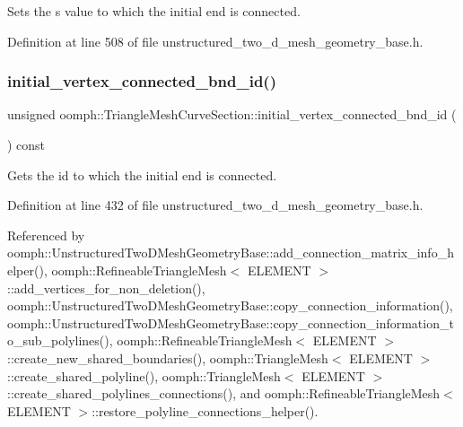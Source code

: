 Sets the s value to which the initial end is connected. 



Definition at line 508 of file unstructured\+\_\+two\+\_\+d\+\_\+mesh\+\_\+geometry\+\_\+base.\+h.

\mbox{\label{classoomph_1_1TriangleMeshCurveSection_aa20f1e54ff6f0f1ef0c550e0a2d119bb}} 
\subsubsection{\texorpdfstring{initial\+\_\+vertex\+\_\+connected\+\_\+bnd\+\_\+id()}{initial\_vertex\_connected\_bnd\_id()}\hspace{0.1cm}{\footnotesize\ttfamily [1/2]}}
{\footnotesize\ttfamily unsigned oomph\+::\+Triangle\+Mesh\+Curve\+Section\+::initial\+\_\+vertex\+\_\+connected\+\_\+bnd\+\_\+id (\begin{DoxyParamCaption}{ }\end{DoxyParamCaption}) const\hspace{0.3cm}{\ttfamily [inline]}}



Gets the id to which the initial end is connected. 



Definition at line 432 of file unstructured\+\_\+two\+\_\+d\+\_\+mesh\+\_\+geometry\+\_\+base.\+h.



Referenced by oomph\+::\+Unstructured\+Two\+D\+Mesh\+Geometry\+Base\+::add\+\_\+connection\+\_\+matrix\+\_\+info\+\_\+helper(), oomph\+::\+Refineable\+Triangle\+Mesh$<$ E\+L\+E\+M\+E\+N\+T $>$\+::add\+\_\+vertices\+\_\+for\+\_\+non\+\_\+deletion(), oomph\+::\+Unstructured\+Two\+D\+Mesh\+Geometry\+Base\+::copy\+\_\+connection\+\_\+information(), oomph\+::\+Unstructured\+Two\+D\+Mesh\+Geometry\+Base\+::copy\+\_\+connection\+\_\+information\+\_\+to\+\_\+sub\+\_\+polylines(), oomph\+::\+Refineable\+Triangle\+Mesh$<$ E\+L\+E\+M\+E\+N\+T $>$\+::create\+\_\+new\+\_\+shared\+\_\+boundaries(), oomph\+::\+Triangle\+Mesh$<$ E\+L\+E\+M\+E\+N\+T $>$\+::create\+\_\+shared\+\_\+polyline(), oomph\+::\+Triangle\+Mesh$<$ E\+L\+E\+M\+E\+N\+T $>$\+::create\+\_\+shared\+\_\+polylines\+\_\+connections(), and oomph\+::\+Refineable\+Triangle\+Mesh$<$ E\+L\+E\+M\+E\+N\+T $>$\+::restore\+\_\+polyline\+\_\+connections\+\_\+helper().

